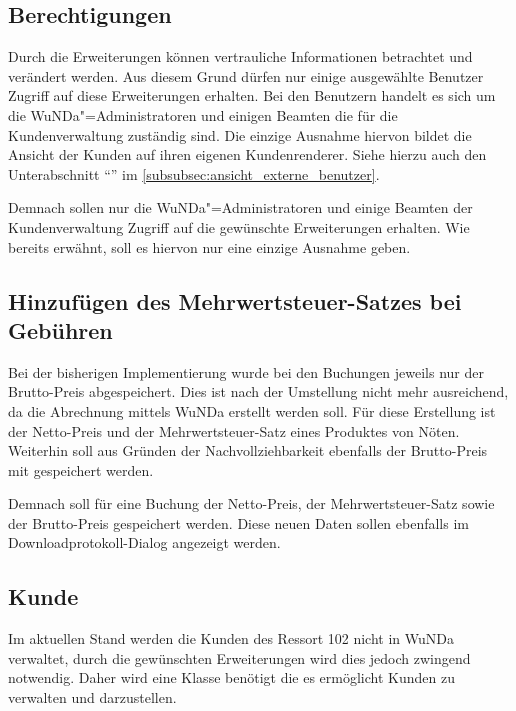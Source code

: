 \subsection{Berechtigungen}
Durch die Erweiterungen können vertrauliche Informationen betrachtet und verändert werden.
Aus diesem Grund dürfen nur einige ausgewählte Benutzer Zugriff auf diese Erweiterungen erhalten.
Bei den Benutzern handelt es sich um die \ac{WuNDa}"=Administratoren und einigen Beamten die für die Kundenverwaltung zuständig sind.
Die einzige Ausnahme hiervon bildet die Ansicht der Kunden auf ihren eigenen Kundenrenderer.
Siehe hierzu auch den Unterabschnitt "`"' im \autoref{subsubsec:ansicht_externe_benutzer}. 

Demnach sollen nur die \ac{WuNDa}"=Administratoren und einige Beamten der Kundenverwaltung Zugriff auf die gewünschte Erweiterungen erhalten. Wie bereits erwähnt, soll es hiervon nur eine einzige Ausnahme geben.

\subsection{Hinzufügen des Mehrwertsteuer-Satzes bei Gebühren}
Bei der bisherigen Implementierung wurde bei den Buchungen jeweils nur der Brutto-Preis abgespeichert. Dies ist nach der Umstellung nicht mehr ausreichend, da die Abrechnung mittels \ac{WuNDa} erstellt werden soll. Für diese Erstellung ist der Netto-Preis und der Mehrwertsteuer-Satz eines Produktes von Nöten. Weiterhin soll aus Gründen der Nachvollziehbarkeit ebenfalls der Brutto-Preis mit gespeichert werden.

Demnach soll für eine Buchung der Netto-Preis, der Mehrwertsteuer-Satz sowie der Brutto-Preis gespeichert werden. Diese neuen Daten sollen ebenfalls im Downloadprotokoll-Dialog angezeigt werden.
\subsection{Kunde}
Im aktuellen Stand werden die Kunden des Ressort 102 nicht in \ac{WuNDa} verwaltet, durch die gewünschten Erweiterungen wird dies jedoch zwingend notwendig. Daher wird eine Klasse  benötigt die es ermöglicht Kunden zu verwalten und darzustellen. 


